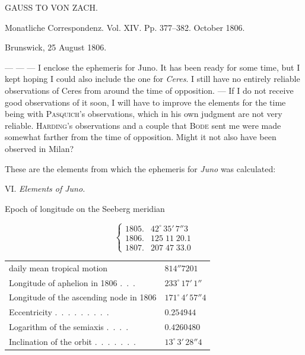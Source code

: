\begin{center}
GAUSS TO VON ZACH.
\end{center}

\begin{center}
Monatliche Correspondenz. Vol. XIV. Pp. 377–382. October 1806.
\end{center}

\begin{flushright}
Brunswick, 25 August 1806.
\end{flushright}

\par\indent --- --- --- I enclose the ephemeris for Juno. It has been ready for some time, but I kept hoping I could also include the one for \emph{Ceres}. I still have no entirely reliable observations of Ceres from around the time of
%
opposition. --- If I do not receive good observations of it soon, I will have to improve the elements for the time being with \textsc{Pasquich}’s observations, which in his own judgment are not very reliable. \textsc{Harding}’s observations and a couple that \textsc{Bode} sent me were made somewhat farther from the time of opposition. Might it not also have been observed in Milan?

\par\indent These are the elements from which the ephemeris for \emph{Juno} was calculated:

\begin{center}
VI. \emph{Elements of Juno.}
\end{center}

\begin{center}
Epoch of longitude on the Seeberg meridian
\end{center}
\[
\left\{\begin{array}{ll}
1805. & 42^\circ\,35'\,7''3\\
1806. & 125\;11\;20.1\\
1807. & 207\;47\;33.0
\end{array}\right.
\]
\begin{center}\begingroup
\fontsize{9}{11}\selectfont
\setlength{\tabcolsep}{3pt}\renewcommand{\arraystretch}{1.12}
\begin{tabular}{ll}
daily mean tropical motion  & $814''7201$ \\
Longitude of aphelion in 1806 .\ .\ . & $233^\circ\,17'\,1''$ \\
Longitude of the ascending node in 1806  & $171^\circ\,4'\,57''4$ \\
Eccentricity .\ .\ .\ .\ .\ .\ .\ .\ . & $0.254944$ \\
Logarithm of the semiaxis .\ .\ .\ . & $0.4260480$ \\
Inclination of the orbit .\ .\ .\ .\ .\ .\ . & $13^\circ\,3'\,28''4$ \\
\end{tabular}\endgroup\end{center}

